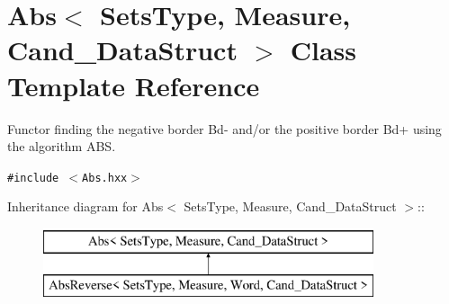 \section{Abs$<$ Sets\-Type, Measure, Cand\_\-Data\-Struct $>$ Class Template Reference}
\label{class_abs}
Functor finding the negative border Bd- and/or the positive border Bd+ using the algorithm ABS.  


{\tt \#include $<$Abs.hxx$>$}

Inheritance diagram for Abs$<$ Sets\-Type, Measure, Cand\_\-Data\-Struct $>$::\begin{figure}[H]
\begin{center}
\leavevmode
\includegraphics[height=2cm]{class_abs}
\end{center}
\end{figure}
